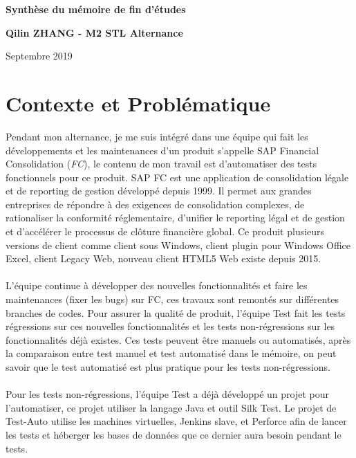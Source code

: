 \documentclass[french]{article}
\begin{document}
	\begin{center}
		\textbf{\LARGE{Synthèse du mémoire de fin d'études}}
	\end{center}
	
	\begin{center}
		\textbf{\Large{Qilin ZHANG - M2 STL Alternance}}
	\end{center}

	\begin{flushright}
		\large {Septembre 2019}
	\end{flushright}

	\section{Contexte et Problématique}
	Pendant mon alternance, je me suis intégré dans une équipe qui fait les développements et les maintenances d'un produit s'appelle SAP Financial Consolidation (\textit{FC}), le contenu de mon travail est d'automatiser des tests fonctionnels pour ce produit. SAP FC est une application de consolidation légale et de 	reporting de gestion développé depuis 1999. Il permet aux grandes entreprises de répondre à des exigences de consolidation complexes, de rationaliser la conformité réglementaire, d’unifier le reporting légal et de gestion et d’accélérer le processus de clôture financière global. Ce produit plusieurs versions de client comme client sous Windows, client plugin pour Windows Office Excel, client Legacy Web, nouveau client HTML5 Web existe depuis 2015. 
	\paragraph*{}
	L'équipe continue à développer des nouvelles fonctionnalités et faire les maintenances (fixer les bugs) sur FC, ces travaux sont remontés sur différentes branches de codes. Pour assurer la qualité de produit, l'équipe Test fait les tests régressions sur ces nouvelles fonctionnalités et les tests non-régressions sur les fonctionnalités déjà existes. Ces tests peuvent être manuels ou automatisés, après la comparaison entre test manuel et test automatisé dans le mémoire, on peut savoir que le test automatisé est plus pratique pour les tests non-régressions.
	
	\paragraph*{}
	Pour les tests non-régressions, l'équipe Test a déjà développé un projet pour l'automatiser, ce projet utiliser la langage Java et outil Silk Test. Le projet de Test-Auto utilise les machines virtuelles, Jenkins slave, et Perforce afin de lancer les tests et héberger les bases de données que ce dernier aura besoin pendant le tests.
	
\end{document}

